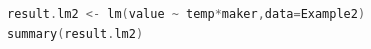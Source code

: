 \begin{lstlisting}[language=c++,label={code:23_10},caption={Run as a linear model}]
result.lm2 <- lm(value ~ temp*maker,data=Example2)
summary(result.lm2)
\end{lstlisting}
